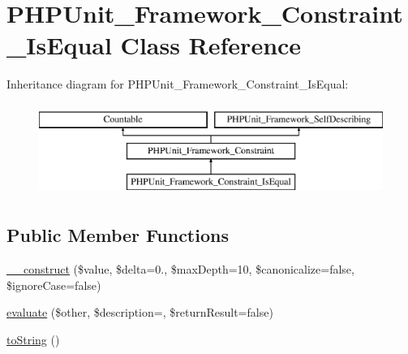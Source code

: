 \hypertarget{class_p_h_p_unit___framework___constraint___is_equal}{}\section{P\+H\+P\+Unit\+\_\+\+Framework\+\_\+\+Constraint\+\_\+\+Is\+Equal Class Reference}
\label{class_p_h_p_unit___framework___constraint___is_equal}
Inheritance diagram for P\+H\+P\+Unit\+\_\+\+Framework\+\_\+\+Constraint\+\_\+\+Is\+Equal\+:\begin{figure}[H]
\begin{center}
\leavevmode
\includegraphics[height=3.000000cm]{class_p_h_p_unit___framework___constraint___is_equal}
\end{center}
\end{figure}
\subsection*{Public Member Functions}
\begin{DoxyCompactItemize}
\item 
\mbox{\hyperlink{class_p_h_p_unit___framework___constraint___is_equal_a802b4f2de05667a7d6a8c8973944dc35}{\+\_\+\+\_\+construct}} (\$value, \$delta=0., \$max\+Depth=10, \$canonicalize=false, \$ignore\+Case=false)
\item 
\mbox{\hyperlink{class_p_h_p_unit___framework___constraint___is_equal_a4c184790087f7d42c3daf0d0180fe5fb}{evaluate}} (\$other, \$description=\textquotesingle{}\textquotesingle{}, \$return\+Result=false)
\item 
\mbox{\hyperlink{class_p_h_p_unit___framework___constraint___is_equal_a5558c5d549f41597377fa1ea8a1cefa3}{to\+String}} ()
\end{DoxyCompactItemize}
